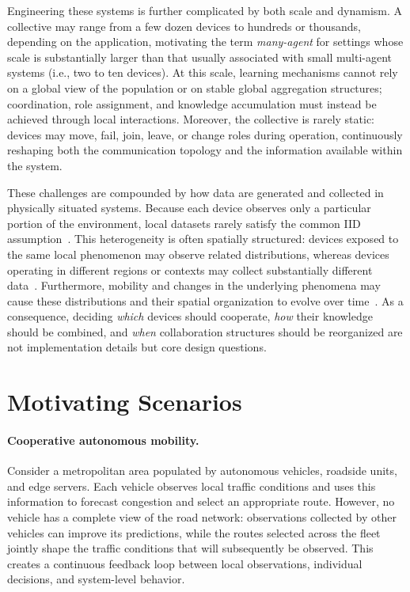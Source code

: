 Engineering these systems is further complicated 
 by both scale and dynamism. 
% 
A collective may range from a few dozen devices to hundreds or thousands,
 depending on the application, 
 motivating the term \emph{many-agent} for settings whose scale is substantially larger 
 than that usually associated with small multi-agent systems (i.e., two to ten devices). 
% 
At this scale, 
 learning mechanisms cannot rely on a global view of the population 
 or on stable global aggregation structures; 
 coordination, role assignment, and knowledge accumulation must instead be achieved 
 through local interactions. 
% 
Moreover, 
 the collective is rarely static: 
 devices may move, fail, join, leave, or change roles during operation, 
 continuously reshaping both the communication topology 
 and the information available within the system.

These challenges are compounded by how data are generated and collected
 in physically situated systems.
%
Because each device observes only a particular portion of the environment,
 local datasets rarely satisfy the common \gls{IID} assumption~\cite{DBLP:conf/icde/LiDCH22}.
%
This heterogeneity is often spatially structured:
 devices exposed to the same local phenomenon may observe related distributions,
 whereas devices operating in different regions or contexts may collect
 substantially different data~\cite{esterle2022deep}.
%
Furthermore,
 mobility and changes in the underlying phenomena
 may cause these distributions and their spatial organization to evolve over time~\cite{DBLP:journals/corr/abs-2606-18003}.
%
As a consequence,
 deciding \emph{which} devices should cooperate,
 \emph{how} their knowledge should be combined,
 and \emph{when} collaboration structures should be reorganized
 are not implementation details but core design questions.


\section{Motivating Scenarios}\label{sec:motivating-scenarios}

\paragraph{Cooperative autonomous mobility.}
Consider a metropolitan area populated by 
 autonomous vehicles, roadside units, and edge servers. 
% 
Each vehicle observes local traffic conditions 
 and uses this information to forecast congestion and select an appropriate route. 
% 
However, 
 no vehicle has a complete view of the road network: 
 observations collected by other vehicles can improve its predictions, 
 while the routes selected across the fleet jointly shape the traffic conditions 
 that will subsequently be observed. 
% 
This creates a continuous feedback loop between local observations, 
 individual decisions, and system-level behavior.

